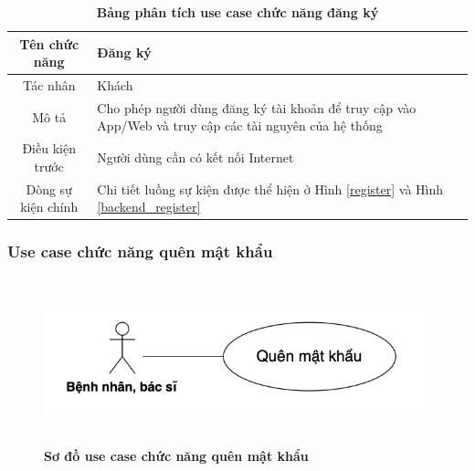   \begin{table}[H]
    \caption{\bfseries \fontsize{12pt}{0pt}\selectfont Bảng phân tích use case chức năng đăng ký}
    \centering
    \begin{tabularx}{0.9\textwidth}{|c|X|}
      \hline
      \textbf{Tên chức năng} & \textbf{Đăng ký} \\
      \hline
      Tác nhân & Khách \\
      \hline
      Mô tả & Cho phép người dùng đăng ký tài khoản để truy cập vào App/Web 
      và truy cập các tài nguyên của hệ thống \\
      \hline
      Điều kiện trước & Người dùng cần có kết nối Internet \\
      \hline
      Dòng sự kiện chính & 
        Chi tiết luồng sự kiện được thể hiện ở Hình \ref{register} và Hình \ref{backend_register}\\
      \hline
    \end{tabularx}
  \end{table}

\subsubsection{Use case chức năng quên mật khẩu}
  \begin{figure}[H]
    \centering
    \includegraphics[width=12cm,height=4.8cm]{Images/use_case/use_case_forgot_password.png}
    \caption[Sơ đồ use case chức năng quên mật khẩu]{\bfseries \fontsize{12pt}{0pt}
    \selectfont Sơ đồ use case chức năng quên mật khẩu}
    \label{use_case_forgot_password} %
  \end{figure}

